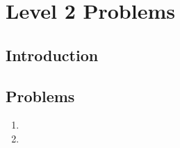 \chapter{Level 2 Problems}

\section{Introduction}



\section{Problems}

\begin{enumerate}
    \item 
    \item 
\end{enumerate}

